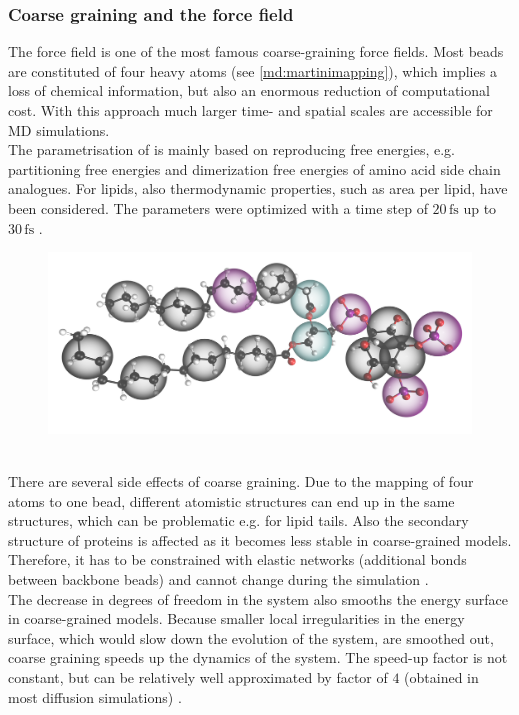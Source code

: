 \subsubsection{Coarse graining and the \martini{} force field}
\label{subsub:coarsegraining}
The \martini{} force field \autocites{martini}{martini22}{martini22_lipids} is one of the most famous coarse-graining force fields. Most beads are constituted of four heavy atoms (see \autoref{md:martinimapping}), which implies a loss of chemical information, but also an enormous reduction of computational cost. With this approach much larger time- and spatial scales are accessible for MD simulations.\\
The parametrisation of \martini{} is mainly based on reproducing free energies, e.g. partitioning free energies and dimerization free energies of amino acid side chain analogues. For lipids, also thermodynamic properties, such as area per lipid, have been considered. The parameters were optimized with a time step of $20\,\si{\femto\second}$ up to $30\,\si{\femto\second}$ \autocites{martini22}{martini22_lipids}.\\
%
%
%
\begin{figure}[b]
	\centering
	\includegraphics[width=.5\textwidth]{figures/introduction/fig_martini_mapping}
	\label{md:martinimapping}
\end{figure}
%
%
%
\\
There are several side effects of coarse graining. Due to the mapping of four atoms to one bead, different atomistic structures can end up in the same \martini{} structures, which can be problematic e.g. for lipid tails. Also the secondary structure of proteins is affected as it becomes less stable in coarse-grained models. Therefore, it has to be constrained with elastic networks (additional bonds between backbone beads) and cannot change during the simulation \autocite{martini22_check}.\\
The decrease in degrees of freedom in the system also smooths the energy surface in coarse-grained models. Because smaller local irregularities in the energy surface, which would slow down the evolution of the system, are smoothed out, coarse graining speeds up the dynamics of the system. The speed-up factor is not constant, but can be relatively well approximated by factor of $4$ (obtained in most diffusion simulations) \autocites{martini22_check}{martini}.\\
